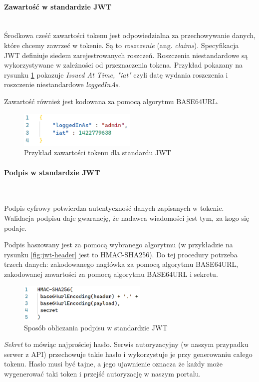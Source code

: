 \documentclass[12pt]{article}
\newcommand{\myparagraph}[1]{\paragraph{#1}\mbox{}\\}
\numberwithin{figure}{section}
\begin{document}
\begin{sloppypar}
    \myparagraph{Zawartość w standardzie JWT}
    Środkowa cześć zawartości tokenu jest odpowiedzialna za przechowywanie danych, które chcemy zawrzeć w tokenie. Są to \textit{roszczenie} (ang. \textit{claims}). Specyfikacja JWT definiuje siedem zarejestrowanych roszczeń. Roszczenia niestandardowe są wykorzystywane w zależności od przeznaczenia tokena.
    Przykład pokazany na rysunku \ref{fig:jwt-payload} pokazuje \textit{Issued At Time, "iat"} czyli datę wydania roszczenia i roszczenie niestandardowe \textit{loggedInAs}.
    
    Zawartość również jest kodowana za pomocą algorytmu BASE64URL.
    \begin{figure}[H] 
     	\centering
    	\includegraphics[width=0.5\textwidth]{images/chapter_3/jwt-payload.png}
    	\caption{Przykład zawartości tokenu dla standardu JWT}
    	\label{fig:jwt-payload}
    \end{figure}
    
    \myparagraph{Podpis w standardzie JWT}
    \label{signature}
    
    Podpis cyfrowy potwierdza autentyczność danych zapisanych w tokenie. Walidacja podpisu daje gwarancję, że nadawca wiadomości jest tym, za kogo się podaje.
    
    Podpis haszowany jest za pomocą wybranego algorytmu (w przykładzie na rysunku \ref{fig:jwt-header} jest to HMAC-SHA256). Do tej procedury potrzeba trzech danych: zakodowanego nagłówka za pomocą algorytmu BASE64URL, zakodowanej zawartości za pomocą algorytmu BASE64URL i sekretu. 
    
    \begin{figure}[H] 
     	\centering
    	\includegraphics[width=0.55\textwidth]{images/chapter_3/jwt-signature.png}
    	\caption{Sposób obliczania podpisu w standardzie JWT}
    	\label{fig:jwt-signature}
    \end{figure}
    
    \textit{Sekret} to mówiąc najprościej hasło. Serwis autoryzacyjny (w naszym przypadku serwer z API) przechowuje takie hasło i wykorzystuje je przy generowaniu całego tokenu. Hasło musi być tajne, a jego ujawnienie oznacza że każdy może wygenerować taki token i przejść autoryzację w naszym portalu.
    

\end{sloppypar}
\end{document}
